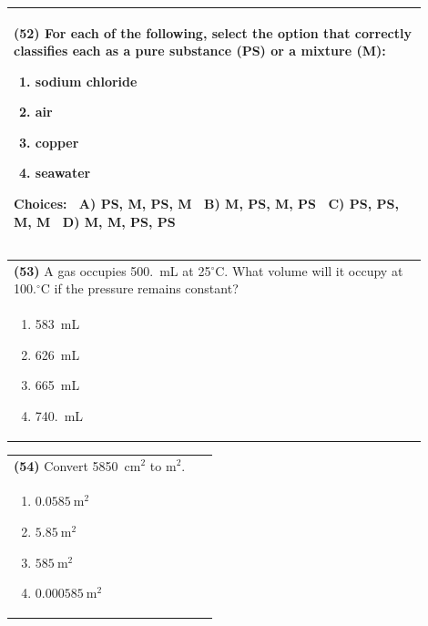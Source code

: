 \documentclass{article}
\begin{document}
\noindent\begin{tabular}{|p{0.9\linewidth}|}
\hline
\textbf{(52)} For each of the following, select the option that correctly classifies each as a pure substance (PS) or a mixture (M): \
\begin{minipage}[t]{0.85\linewidth}
\begin{enumerate}[label=\alph*.]
\item sodium chloride
\item air
\item copper
\item seawater
\end{enumerate}
\textbf{Choices:} \
A) PS, M, PS, M \
B) M, PS, M, PS \
C) PS, PS, M, M \
D) M, M, PS, PS
\end{minipage}\\[0.2cm]
\hline
\end{tabular}

\noindent\begin{tabular}{|p{0.9\linewidth}|}
\hline
\textbf{(53)} A gas occupies 500.~mL at 25$^\circ$C. What volume will it occupy at 100.$^\circ$C if the pressure remains constant? \\[0.2cm]

\begin{minipage}[t]{0.85\linewidth}
\begin{enumerate}[label=\alph*.]
\item 583~mL
\item 626~mL
\item 665~mL
\item 740.~mL
\end{enumerate}
\end{minipage}\\[0.2cm]
\hline
\end{tabular}

\noindent\begin{tabular}{|p{0.9\linewidth}|}
\hline
\textbf{(54)} Convert 5850~$\text{cm}^2$ to $\text{m}^2$. \\
\begin{minipage}[t]{0.85\linewidth}
\begin{enumerate}[label=\alph*.]
    \item $0.0585~\text{m}^2$
    \item $5.85~\text{m}^2$
    \item $585~\text{m}^2$
    \item $0.000585~\text{m}^2$
\end{enumerate}
\end{minipage}\\[0.2cm]
\hline
\end{tabular}
\end{document}
